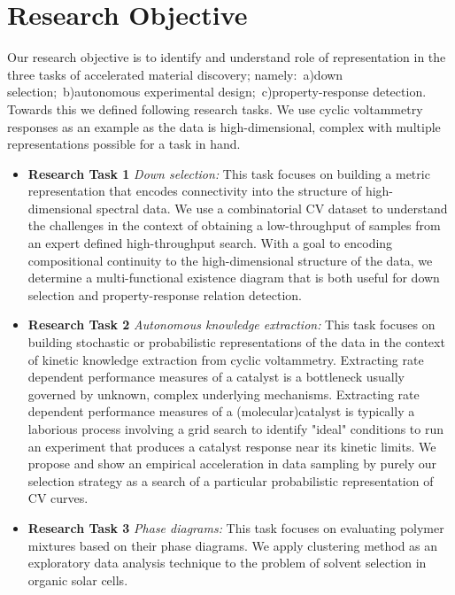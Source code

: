 \section*{Research Objective}
Our research objective is to identify and understand role of representation in the three tasks of accelerated material discovery; namely:~a)down selection;~b)autonomous experimental design;~c)property-response detection. Towards this we defined following research tasks. We use cyclic voltammetry responses as an example as the data is high-dimensional, complex with multiple representations possible for a task in hand.
\begin{itemize}
    \item {\textbf{Research Task 1 }\textit{Down selection:} This task focuses on building a metric representation that encodes connectivity into the structure of high-dimensional spectral data. We use a combinatorial CV dataset to understand the challenges in the context of obtaining a low-throughput of samples from an expert defined high-throughput search. With a goal to encoding compositional continuity to the high-dimensional structure of the data, we determine a multi-functional existence diagram that is both useful for down selection and property-response relation detection.}
    \item{\textbf{Research Task 2 }\textit{Autonomous knowledge extraction:} This task focuses on building stochastic or probabilistic representations of the data in the context of kinetic knowledge extraction from cyclic voltammetry. Extracting rate dependent performance measures of a catalyst is a bottleneck usually governed by unknown, complex underlying mechanisms. Extracting rate dependent performance measures of a (molecular)catalyst is typically a laborious process involving a grid search to identify "ideal" conditions to run an experiment that produces a catalyst response near its kinetic limits. We propose and show an empirical acceleration in data sampling by purely our selection strategy as a search of a particular probabilistic representation of CV curves.}
    \item{\textbf{Research Task 3 }\textit{Phase diagrams:} This task focuses on evaluating polymer mixtures based on their phase diagrams. We apply clustering method as an exploratory data analysis technique to the problem of solvent selection in organic solar cells.}
\end{itemize}
